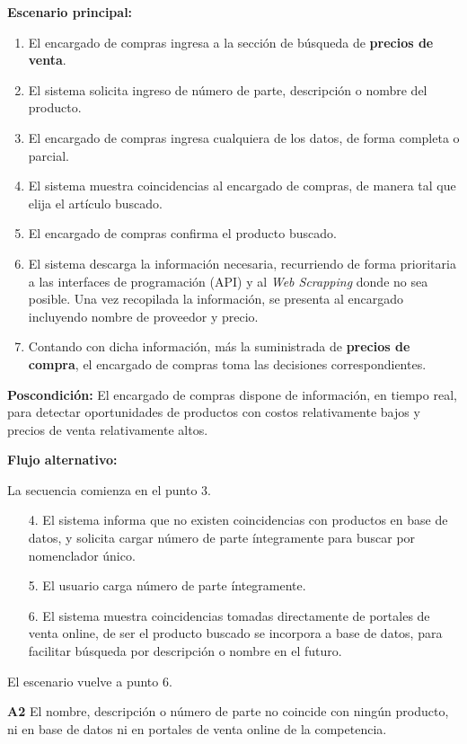 \textbf{Escenario principal:}
\begin{enumerate}
	\item El encargado de compras ingresa a la sección de búsqueda de \textbf{precios de venta}.
	\item El sistema solicita ingreso de número de parte, descripción o nombre del producto.
	\item El encargado de compras ingresa cualquiera de los datos, de forma completa o parcial.
	\item El sistema muestra coincidencias al encargado de compras, de manera tal que elija el artículo buscado.
	\item El encargado de compras confirma el producto buscado.
	\item El sistema descarga la información necesaria, 
	recurriendo de forma prioritaria a las interfaces de programación (API)
	y al \textit{Web Scrapping} donde no sea posible. Una vez recopilada la información, 
	se presenta al encargado incluyendo nombre de proveedor y precio.
	\item Contando con dicha información, más la suministrada de \textbf{precios de compra},
	el encargado de compras toma las decisiones correspondientes.
\end{enumerate}

\textbf{Poscondición:}
El encargado de compras dispone de información, 
en tiempo real, 
para detectar oportunidades de productos con costos relativamente bajos y precios de venta relativamente altos.

\textbf{Flujo alternativo:}

La secuencia comienza en el punto 3.

\begin{enumerate}
	\item[4.] El sistema informa que no existen coincidencias con productos en base de datos,
	y solicita cargar número de parte íntegramente para buscar por nomenclador único.
	\item[5.] El usuario carga número de parte íntegramente.
	\item[6.] El sistema muestra coincidencias tomadas directamente de portales de venta online,
	de ser el producto buscado se incorpora a base de datos,
	para facilitar búsqueda por descripción o nombre en el futuro.
\end{enumerate}

El escenario vuelve a punto 6.

\textbf{A2} El nombre, descripción o número de parte no coincide con ningún producto, ni en base de datos ni en portales de venta online de la competencia.

